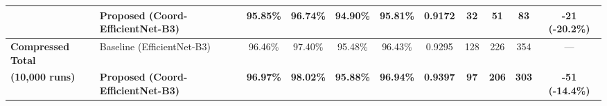 \documentclass[conference]{IEEEtran}
\begin{document}
\begin{table}[t]
\begin{tabular}{llccccccccc}
      & \textbf{Proposed (Coord-EfficientNet-B3)} & \textbf{95.85\%} & \textbf{96.74\%} & \textbf{94.90\%} & \textbf{95.81\%} & \textbf{0.9172} & \textbf{32} & \textbf{51} & \textbf{83} & \textbf{-21 (-20.2\%)} \\
\midrule
\textbf{Compressed Total} & Baseline (EfficientNet-B3) & 96.46\% & 97.40\% & 95.48\% & 96.43\% & 0.9295 & 128 & 226 & 354 & --- \\
\textbf{(10,000 runs)}     & \textbf{Proposed (Coord-EfficientNet-B3)} & \textbf{96.97\%} & \textbf{98.02\%} & \textbf{95.88\%} & \textbf{96.94\%} & \textbf{0.9397} & \textbf{97} & \textbf{206} & \textbf{303} & \textbf{-51 (-14.4\%)} \\
\bottomrule
\end{tabular}
\end{table}
\end{document}
